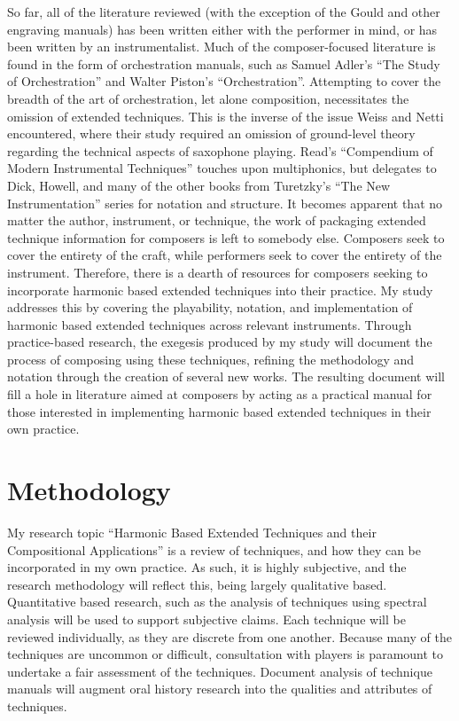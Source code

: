 So far, all of the literature reviewed (with the exception of the Gould and other engraving manuals) has been written either with the performer in mind, or has been written by an instrumentalist. Much of the composer-focused literature is found in the form of orchestration manuals, such as Samuel Adler’s “The Study of Orchestration” and Walter Piston’s “Orchestration”.\autocite{adlerStudyOrchestration2002, pistonOrchestration1969} Attempting to cover the breadth of the art of orchestration, let alone composition, necessitates the omission of extended techniques. This is the inverse of the issue Weiss and Netti encountered, where their study required an omission of ground-level theory regarding the technical aspects of saxophone playing. Read’s “Compendium of Modern Instrumental Techniques” touches upon multiphonics, but delegates to Dick, Howell, and many of the other books from Turetzky’s “The New Instrumentation” series for notation and structure.\autocite[160]{readCompendiumModernInstrumental1993} It becomes apparent that no matter the author, instrument, or technique, the work of packaging extended technique information for composers is left to somebody else. Composers seek to cover the entirety of the craft, while performers seek to cover the entirety of the instrument. Therefore, there is a dearth of resources for composers seeking to incorporate harmonic based extended techniques into their practice. My study addresses this by covering the playability, notation, and implementation of harmonic based extended techniques across relevant instruments. Through practice-based research, the exegesis produced by my study will document the process of composing using these techniques, refining the methodology and notation through the creation of several new works. The resulting document will fill a hole in literature aimed at composers by acting as a practical manual for those interested in implementing harmonic based extended techniques in their own practice.


\newpage

\section{Methodology}
My research topic “Harmonic Based Extended Techniques and their Compositional Applications” is a review of techniques, and how they can be incorporated in my own practice. As such, it is highly subjective, and the research methodology will reflect this, being largely qualitative based. Quantitative based research, such as the analysis of techniques using spectral analysis will be used to support subjective claims. Each technique will be reviewed individually, as they are discrete from one another. Because many of the techniques are uncommon or difficult, consultation with players is paramount to undertake a fair assessment of the techniques. Document analysis of technique manuals will augment oral history research into the qualities and attributes of techniques.


